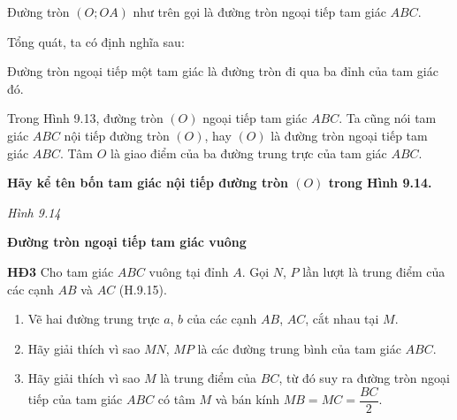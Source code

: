 \begin{lesson}
    Đường tròn $(O;OA)$ như trên gọi là đường tròn ngoại tiếp tam giác $ABC$.

    Tổng quát, ta có định nghĩa sau:

    \begin{keyconcept}
        Đường tròn ngoại tiếp một tam giác là đường tròn đi qua ba đỉnh của tam giác đó.
    \end{keyconcept}

    Trong Hình 9.13, đường tròn $(O)$ ngoại tiếp tam giác $ABC$. Ta cũng nói tam giác $ABC$ nội tiếp đường tròn $(O)$, hay $(O)$ là đường tròn ngoại tiếp tam giác $ABC$. Tâm $O$ là giao điểm của ba đường trung trực của tam giác $ABC$.

    \textbf{Hãy kể tên bốn tam giác nội tiếp đường tròn $(O)$ trong Hình 9.14.}

    \begin{center}

    \textit{Hình 9.14}
    \end{center}

    \answerline

    \textbf{Đường tròn ngoại tiếp tam giác vuông}

    \textbf{HĐ3} Cho tam giác $ABC$ vuông tại đỉnh $A$. Gọi $N$, $P$ lần lượt là trung điểm của các cạnh $AB$ và $AC$ (H.9.15).
    \begin{enumerate}[label=\alph*)]
        \item Vẽ hai đường trung trực $a$, $b$ của các cạnh $AB$, $AC$, cắt nhau tại $M$.

        \answerline
        \item Hãy giải thích vì sao $MN$, $MP$ là các đường trung bình của tam giác $ABC$.

        \answerline
        \answerline
        \item Hãy giải thích vì sao $M$ là trung điểm của $BC$, từ đó suy ra đường tròn ngoại tiếp của tam giác $ABC$ có tâm $M$ và bán kính $MB=MC=\dfrac{BC}{2}$.


\end{enumerate}
\end{lesson}
